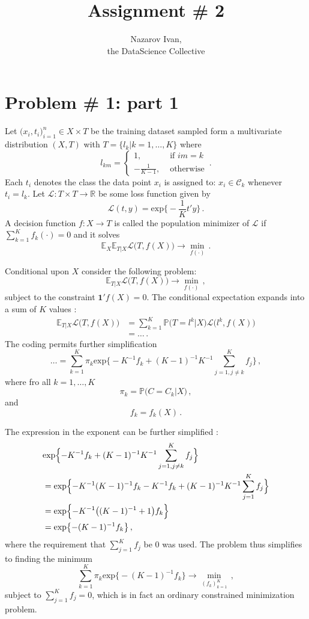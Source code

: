 \documentclass[a4paper]{article}
\title{Assignment \# 2}
\author{Nazarov Ivan, \rus{101мНОД(ИССА)}\\the DataScience Collective}
\newcommand{\Real}{\mathbb{R}}
\newcommand{\pr}{\mathbb{P}}
\newcommand{\ex}{\mathbb{E}}
\newcommand{\Lcal}{\mathcal{L}}
\newcommand{\one}{\mathbf{1}}
\begin{document}
\maketitle

\tableofcontents
\clearpage

\section{Problem \# 1: part 1} %
\label{sec:problem_1}

Let $\bigl(x_i, t_i\bigr)_{i=1}^n\in X\times T$ be the training dataset
sampled form a multivariate distribution $(X,T)$ with $T = \{ l_k | k=1,\ldots,K\}$
where
\[
l_{km} = \begin{cases}
	1, &\text{ if } im = k\\
	- \frac{1}{K-1}, &\text{ otherwise}
\end{cases}  \,.
\]
Each $t_i$ denotes the class the data point $x_i$ is assigned to: $x_i\in \mathcal{C}_k$
whenever $t_i = l_k$. Let $\mathcal{L}: T\times T \to \Real$ be some loss function
given by
\[ \mathcal{L}(t,y) = \text{exp}\bigl\{ -\frac{1}{K} t'y \bigr\} \,. \]
A decision function $f:X\to T$ is called the population minimizer of $\mathcal{L}$ if
$\sum_{k=1}^K f_k(\cdot) = 0$ and it solves
\[ \ex_X \ex_{T|X}\mathcal{L}\bigl(T, f(X)\bigr) \to \min_{f(\cdot)} \,. \]

Conditional upon $X$ consider the following problem:
\[ \ex_{T|X} \Lcal\bigl( T, f(X) \bigr) \to \min_{f(\cdot)}\,, \]
subject to the constraint $\one'f(X) = 0$. The conditional expectation expands into
a sum of $K$ values :
\begin{align*}
	\ex_{T|X} \Lcal\bigl( T, f(X) \bigr)
	&= \sum_{k=1}^K \pr\bigl( T = l^k \big\vert X \bigr) \Lcal\bigl( l^k, f(X) \bigr)\\
	& = \ldots\,.
\end{align*}
The coding permits further simplification
\[
\ldots = \sum_{k=1}^K \pi_k \text{exp}\bigl\{ - K^{-1} f_k + (K-1)^{-1}K^{-1} \sum_{j=1,j\neq k}^K f_j \bigr\} \,,
\]
where fro all $k=1,\ldots, K$
\[ \pi_k = \pr\bigl( C = C_k \big\vert X \bigr) \,, \]
and
\[ f_k = f_k( X )\,. \]

The expression in the exponent can be further simplified :
\begin{align*}
	&  \text{exp}\Bigl\{ - K^{-1} f_k + (K-1)^{-1}K^{-1} \sum_{j=1,j\neq k}^K f_j \Bigr\}\\
	&= \text{exp}\Bigl\{ - K^{-1} (K-1)^{-1} f_k - K^{-1} f_k + (K-1)^{-1}K^{-1} \sum_{j=1}^K f_j \Bigr\}\\
	&= \text{exp}\Bigl\{ - K^{-1}\bigl( (K-1)^{-1} + 1 \bigr) f_k \Bigr\}\\
	&= \text{exp}\bigl\{ - (K-1)^{-1} f_k \bigr\} \,,
\end{align*}
where the requirement that $\sum_{j=1}^K f_j$ be $0$ was used. The problem thus
simplifies to finding the minimum
\[ \sum_{k=1}^K \pi_k \text{exp}\bigl\{ -(K-1)^{-1} f_k \bigr\} \to \min_{(f_k)_{k=1}^K} \,, \]
subject to $\sum_{j=1}^K f_j = 0$, which is in fact an ordinary constrained minimization
problem.
\end{document}

